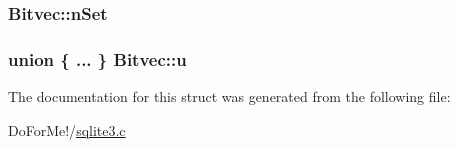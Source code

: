\hypertarget{struct_bitvec_ad6811debae9b972f2d94d667e994e3f6}{
\subsubsection[{n\-Set}]{ Bitvec\-::n\-Set}}\label{struct_bitvec_ad6811debae9b972f2d94d667e994e3f6}
\hypertarget{struct_bitvec_a2ef3423696109b6b699aee3e736c4ed6}{
\subsubsection[{u}]{\setlength{\rightskip}{0pt plus 5cm}union \{ ... \}   Bitvec\-::u}}\label{struct_bitvec_a2ef3423696109b6b699aee3e736c4ed6}


The documentation for this struct was generated from the following file\-:\begin{DoxyCompactItemize}
\item 
Do\-For\-Me!/\hyperlink{sqlite3_8c}{sqlite3.\-c}\end{DoxyCompactItemize}
